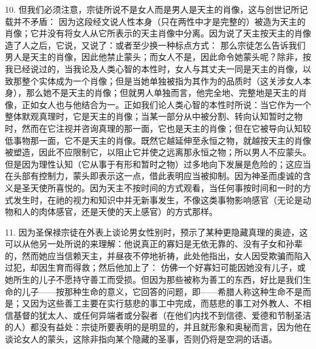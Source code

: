 10. 但我们必须注意，宗徒所说不是女人而是男人是天主的肖像，这与创世记所记载并不矛盾： 因为这段经文说人性本身（只在两性中才是完整的）被造为天主的肖像；它并没有将女人从它所表示的天主肖像中分离。因为说了天主按天主的肖像造了人之后，它说，又说了：或者至少换一种标点方式： 那么宗徒怎么告诉我们男人是天主的肖像，因此他禁止蒙头；而女人不是，因此命令她蒙头呢？除非，按我已经说过的，当我论及人类心智的本性时，女人与其丈夫一同是天主的肖像，以致那整个实体成为一个肖像；但是当她单独被指为其作为的品质时（这关涉女人本身），那么她不是天主的肖像；但就男人单独而言，他完全地、完整地是天主的肖像，正如女人也与他结合为一。正如我们论人类心智的本性时所说：当它作为一个整体默观真理时，它是天主的肖像；当某一部分从中被分割、转向认知暂时之物时，然而在它注视并咨询真理的那一面，它也是天主的肖像；但在它被导向认知较低事物那一面，它不是天主的肖像。既然它越延伸至永恒之物，就越按天主的肖像被塑造，因此不应限制它，以阻止它并使之远离那永恒之物；所以男人不应蒙头。但是因为理性认知（它从事于有形和暂时之物）过多地向下发展是危险的；这应当在头部有控制力，蒙头即表示这一点，借此表明应当被抑制。因为神圣而虔诚的含义是圣天使所喜悦的。因为天主不按时间的方式观看，当任何事按时间和一时的方式发生时，在祂的视力和知识中并无新事发生，不像这类事物影响感官（无论是动物和人的肉体感官，还是天使的天上感官）的方式那样。\par

11. 因为圣保禄宗徒在外表上谈论男女性别时，预示了某种更隐藏真理的奥迹，这可以从他另一处所说的来理解：他说真正的寡妇是无依无靠的、没有子女和孙辈的，然而她应当信赖天主，并昼夜不停地祈祷，此处他指出，女人因受欺骗而陷入过犯，却因生育而得救；然后他加上了： 仿佛一个好寡妇可能因她没有儿子，或她所生的儿子不愿持守善工而受损。但因为那些被称为善工的东西，好比是我们生命的儿子——按那种生命的意义，它回答的问题，即——希腊人称这种生命不是而是；又因为这些善工主要在实行慈悲的事工中完成，而慈悲的事工对外教人、不相信基督的犹太人、或任何异端者或分裂者（在他们内找不到信德、爱德和节制圣洁的人）都没有益处：宗徒所要表明的是明显的，并且就形象和奥秘而言，因为他在谈论女人的蒙头，这除非指向某个隐藏的圣事，否则仍将是空洞的话语。\par

